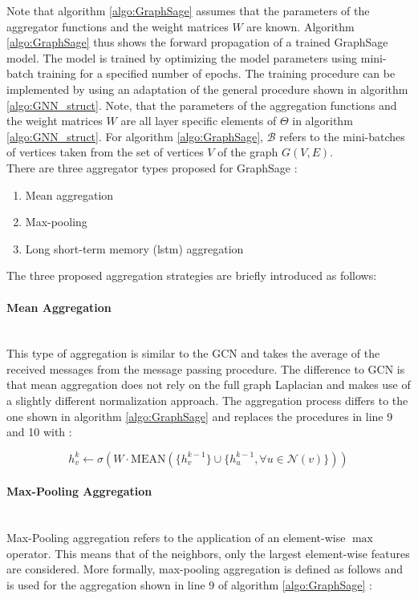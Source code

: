 	\noindent Note that algorithm \ref{algo:GraphSage} assumes that the
	parameters of the aggregator functions and the weight matrices $W$
	are known. Algorithm \ref{algo:GraphSage} thus shows the forward
	propagation of a trained GraphSage model. The model is trained by
	optimizing the model parameters using mini-batch training for a specified 
	number of epochs. The training procedure can be implemented by using an
	adaptation of the general procedure shown in algorithm \ref{algo:GNN_struct}. 
	Note, that the parameters of the aggregation functions and the weight 
	matrices $W$ are all layer specific elements of $\Theta$ in algorithm 
	\ref{algo:GNN_struct}. For algorithm \ref{algo:GraphSage}, $\mathcal{B}$ 
	refers to the mini-batches of vertices taken from the set of vertices $V$ 
	of the graph $G(V,E)$. \\
	\newpage
	\noindent There are three aggregator types proposed for GraphSage
	\citep{hamilton2017inductive}:

	\begin{enumerate}
		\setlength\itemsep{0.2em}
		\item Mean aggregation
		\item Max-pooling
		\item Long short-term memory (\acs{lstm}) aggregation
	\end{enumerate}

	\noindent The three proposed aggregation strategies are briefly introduced
	as follows:

	\paragraph{Mean Aggregation} \mbox{}\\
	\noindent This type of aggregation is similar to the GCN and takes the
	average of the received messages from the message passing procedure. The 
	difference to GCN is that mean aggregation does not rely on the full graph 
	Laplacian and makes use of a slightly different normalization approach. The 
	aggregation process differs to the one shown in algorithm 
	\ref{algo:GraphSage} and replaces the procedures in line 9 and 10 with 
	\citep[p. 5]{hamilton2017inductive}:

	\begin{equation}
		h_{v}^{k} \leftarrow \sigma\left(W\cdot
		\text{MEAN}(\{h_{v}^{k-1}\}\cup\{h_{u}^{k-1},\forall u \in \mathcal{N}(v)\})\right)
	\end{equation}

	\paragraph{Max-Pooling Aggregation} \mbox{}\\
	\noindent Max-Pooling aggregation refers to the application of an 
	element-wise $\max$ operator. This means 
	that of the neighbors, only the largest element-wise features are considered. 
	More formally, max-pooling aggregation is defined as follows and is used 
	for the aggregation shown in line 9 of algorithm \ref{algo:GraphSage} 
	\citep[p. 6]{hamilton2017inductive}:

